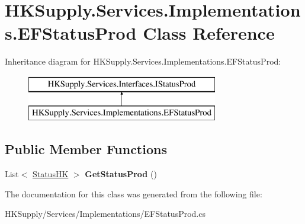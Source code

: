 \hypertarget{class_h_k_supply_1_1_services_1_1_implementations_1_1_e_f_status_prod}{}\section{H\+K\+Supply.\+Services.\+Implementations.\+E\+F\+Status\+Prod Class Reference}
\label{class_h_k_supply_1_1_services_1_1_implementations_1_1_e_f_status_prod}
Inheritance diagram for H\+K\+Supply.\+Services.\+Implementations.\+E\+F\+Status\+Prod\+:\begin{figure}[H]
\begin{center}
\leavevmode
\includegraphics[height=2.000000cm]{class_h_k_supply_1_1_services_1_1_implementations_1_1_e_f_status_prod}
\end{center}
\end{figure}
\subsection*{Public Member Functions}
\begin{DoxyCompactItemize}
\item 
\mbox{\label{class_h_k_supply_1_1_services_1_1_implementations_1_1_e_f_status_prod_a792bdf101ee1aa593d25ab2abc99feca}} 
List$<$ \mbox{\hyperlink{class_h_k_supply_1_1_models_1_1_status_h_k}{Status\+HK}} $>$ {\bfseries Get\+Status\+Prod} ()
\end{DoxyCompactItemize}


The documentation for this class was generated from the following file\+:\begin{DoxyCompactItemize}
\item 
H\+K\+Supply/\+Services/\+Implementations/E\+F\+Status\+Prod.\+cs\end{DoxyCompactItemize}
